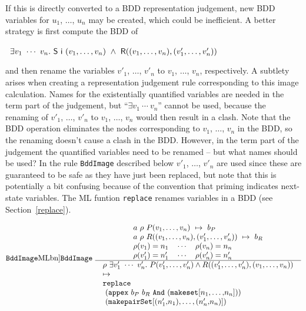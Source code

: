 \documentclass[12pt]{article}
\newcommand{\bnind}[1]{\index[MLbn]{#1}}
\newcommand{\con}[1]{\mbox{\sf #1}}
\newcommand{\ml}[1]{{\tt #1}}
\newcommand{\termbdd}[4]{\mbox{$#1~#2~#3~\mapsto~#4$}}
\begin{document}
If this is directly converted to a BDD representation judgement, new BDD variables for
$u_1$, $\ldots$, $u_n$ may be created, which could be inefficient. A better strategy is
first compute the BDD of

\smallskip

~$\exists v_1~\cdots~v_n.
    ~\con{S}~\con{i}~(v_1,\ldots,v_n)~\wedge~\con{R}((v_1,\ldots,v_n),(v'_1,\ldots,v'_n))$

\smallskip

and then rename the variables $v'_1$, $\ldots$, $v'_n$ to $v_1$,
$\ldots$, $v_n$, respectively. A subtlety arises when creating a
representation judgement rule corresponding to this image
calculation. Names for the existentially quantified variables are
needed in the term part of the judgement, but ``$\exists v_1~\cdots~v_n$''
cannot be used, because the renaming of $v'_1$, $\ldots$, $v'_n$ to
$v_1$, $\ldots$, $v_n$ would then result in a clash. Note that the BDD
operation eliminates the nodes corresponding to $v_1$, $\ldots$, $v_n$
in the BDD, so the renaming doesn't cause a clash in the BDD. However,
in the term part of the judgement the quantified variables need to be
renamed -- but what names should be used? In the rule \ml{BddImage}
described below $v'_1$, $\ldots$, $v'_n$ are used since these are
guaranteed to be safe as they have just been replaced, but note that
this is potentially a bit confusing because of the convention that
priming indicates next-state variables. The ML funtion
\ml{replace} renames variables in a BDD (see Section~\ref{replace}).


\smallskip


$\raisebox{3mm}{\ml{BddImage}\bnind{\ml{BddImage}}}~\begin{array}{c}
\begin{array}{l}
\termbdd{a}{\rho}{P(v_1,\ldots,v_n)}{b_P} \\
\termbdd{a}{\rho}{R((v_1,\ldots,v_n),(v'_1,\ldots,v'_n))}{b_R}\\
\rho(v_1)=n_1 \quad \cdots \quad \rho(v_n)=n_n\\
\rho(v'_1)=n'_1 \quad \cdots \quad \rho(v'_n)=n'_n
\end{array}
\\ \hline
\begin{array}{l}
{\rho}~
{\exists v'_1~\cdots~v'_n.~ P(v'_1,\ldots,v'_n) \wedge R((v'_1,\ldots,v'_n),(v_1,\ldots,v_n))}\\
\mapsto\\
\ml{replace}\\
~(\ml{appex}~b_P~b_R~\ml{And}~\ml{(makeset[}n_1\ml{,}\ldots\ml{,}n_n\ml{])})\\
~(\ml{makepairSet[(}n'_1\ml{,}n_1\ml{),}\ldots\ml{,(}n'_n\ml{,}n_n\ml{)]})
\end{array}
\end{array}$
\end{document}
